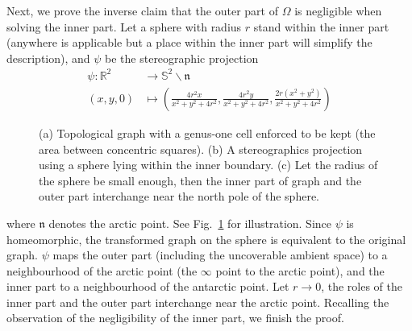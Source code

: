 \documentclass[Afour,sageh,times]{sagej}
\begin{document}
Next, we prove the inverse claim that the outer part of $\Omega$ is negligible when solving the inner part.  
Let a sphere with radius $r$ stand within the inner part (anywhere is applicable but a place within the inner part will simplify the
 description), and $\psi$ be the stereographic projection~\cite{coxeter1961introduction}
\begin{equation}
\begin{aligned}
\psi: \mathbb{R}^2&\rightarrow \mathbb{S}^2\backslash \mathfrak{n}\\
(x, y, 0)&\mapsto (\frac{4r^2x}{x^2 + y^2 + 4r^2}, \frac{4r^2y}{x^2 + y^2 + 4r^2}, \frac{2r(x^2 + y^2)}{x^2 + y^2 + 4r^2})
\end{aligned}
\end{equation}
\begin{figure}[t]
\centering
{}
\caption{ (a) Topological graph with a genus-one cell enforced to be kept (the area between concentric squares). 
(b) A stereographics projection using a sphere lying within the inner boundary. 
(c) Let the radius of the sphere be small enough, then the inner part of graph and the outer part interchange 
near the north pole of the sphere. }
\label{fig_stereographic_projection}
\end{figure}
where $\mathfrak{n}$ denotes the arctic point. See Fig.~\ref{fig_stereographic_projection} for illustration. Since $\psi$ is homeomorphic, 
the transformed graph on the sphere is equivalent to the original graph.  $\psi$ maps the outer part (including the uncoverable ambient 
space) to a neighbourhood of the arctic point (the $\infty$ point to the arctic point), and the inner part to a neighbourhood of the antarctic point. 
Let $r\rightarrow 0$, the roles of the inner part and the outer part interchange near the arctic point. 
Recalling the observation of the negligibility of the inner part, we finish the proof.
\end{document}
